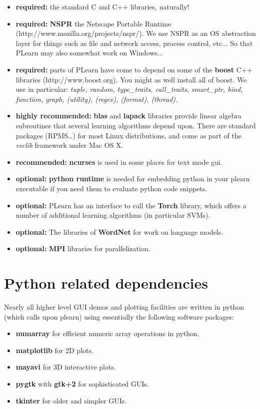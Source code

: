 \documentclass[11pt]{book}
\begin{document}
\begin{itemize}
\item {\bf required:} the standard C and C++ libraries, naturally!
\item {\bf required:} {\bf NSPR} the Netscape Portable Runtime
  (http://www.mozilla.org/projects/nspr/). We use NSPR as an OS abstraction
  layer for things such as file and network access, process control,
  etc... So that PLearn may also somewhat work on Windows...
\item {\bf required:} parts of PLearn have come to depend on some of the
  {\bf boost} C++ libraries (http://www.boost.org). You might as well install all
  of boost. We use in particular: {\em tuple, random, type\_traits, call\_traits, smart\_ptr, bind, function, graph, (utility), (regex), (format), (thread).}
\item {\bf highly recommended:} {\bf blas} and {\bf lapack} libraries provide linear algebra
  subroutines that several learning algorithms depend upon. There are standard
  packages (RPMS\ldots) for most Linux distributions, and come as part of
  the {\em veclib} framework under Mac OS X.
\item {\bf recommended:} {\bf ncurses} is used in some places for text mode
  gui.
\item {\bf optional:} {\bf python runtime} is needed for embedding python
  in your plearn executable if you need them to evaluate python code snippets.
\item {\bf optional:} PLearn has an interface to call the {\bf Torch}
  library, which offers a number of additional learning algorithms (in particular SVMs). 
\item {\bf optional:} The libraries of {\bf WordNet} for work on language
  models.
\item {\bf optional:} {\bf MPI} libraries for parallelization.
\end{itemize}

\section{Python related dependencies}

Nearly all higher level GUI demos and plotting facilities are written in
python (which calls upon plearn) using essentially the following software
packages: \\
\begin{itemize}
\item {\bf numarray} for efficient numeric array operations in python.
\item {\bf matplotlib} for 2D plots.
\item {\bf mayavi} for 3D interactive plots.
\item {\bf pygtk} with {\bf gtk+2} for sophisticated GUIs.
\item {\bf tkinter} for older and simpler GUIs.
\end{itemize}
\end{document}
